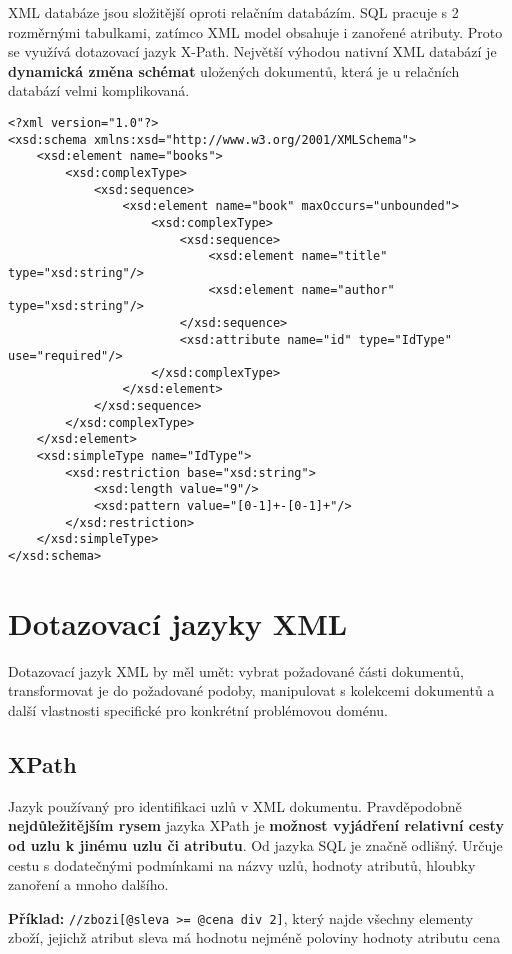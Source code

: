 XML databáze jsou složitější oproti relačním databázím. SQL pracuje s 2 rozměrnými tabulkami, zatímco XML model obsahuje i zanořené atributy. Proto se využívá dotazovací jazyk X-Path. Největší výhodou nativní XML databází je \textbf{dynamická změna schémat} uložených dokumentů, která je u relačních databází velmi komplikovaná.

\begin{verbatim}
<?xml version="1.0"?>
<xsd:schema xmlns:xsd="http://www.w3.org/2001/XMLSchema">
    <xsd:element name="books">
        <xsd:complexType>
            <xsd:sequence>
                <xsd:element name="book" maxOccurs="unbounded">
                    <xsd:complexType>
                        <xsd:sequence>
                            <xsd:element name="title" type="xsd:string"/>
                            <xsd:element name="author" type="xsd:string"/>
                        </xsd:sequence>
                        <xsd:attribute name="id" type="IdType" use="required"/>
                    </xsd:complexType>
                </xsd:element>
            </xsd:sequence>
        </xsd:complexType>
    </xsd:element>
    <xsd:simpleType name="IdType">
        <xsd:restriction base="xsd:string">
            <xsd:length value="9"/>
            <xsd:pattern value="[0-1]+-[0-1]+"/>
        </xsd:restriction>
    </xsd:simpleType>
</xsd:schema>
\end{verbatim}

\section{Dotazovací jazyky XML}
Dotazovací jazyk XML by měl umět: vybrat požadované části dokumentů, transformovat je do požadované podoby, manipulovat s kolekcemi dokumentů a další vlastnosti specifické pro konkrétní problémovou doménu.

\subsection{XPath}
Jazyk používaný pro identifikaci uzlů v XML dokumentu. Pravděpodobně \textbf{nejdůležitějším rysem} jazyka XPath je \textbf{možnost vyjádření relativní cesty od uzlu k jinému uzlu či atributu}. Od jazyka SQL je značně odlišný. Určuje cestu s dodatečnými podmínkami na názvy uzlů, hodnoty atributů, hloubky zanoření a mnoho dalšího.

\textbf{Příklad:} \texttt{//zbozi[@sleva >= @cena div 2]}, který najde všechny elementy zboží, jejichž atribut sleva má hodnotu nejméně poloviny hodnoty atributu cena

